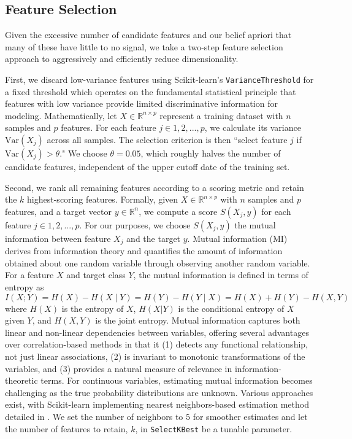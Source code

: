\documentclass[12pt,twoside]{report}
\begin{document}
\subsection{Feature Selection}

Given the excessive number of candidate features and our belief apriori that many of these have little to no signal, we take a two-step feature selection approach to aggressively and efficiently reduce dimensionality.

First, we discard low-variance features using Scikit-learn's \texttt{VarianceThreshold} for a fixed threshold which operates on the fundamental statistical principle that features with low variance provide limited discriminative information for modeling. Mathematically, let $X \in \mathbb{R}^{n \times p}$ represent a training dataset with $n$ samples and $p$ features. For each feature $j \in {1, 2, ..., p}$, we calculate its variance $\text{Var}(X_j)$ across all samples. The selection criterion is then ``select feature $j$ if $\text{Var}(X_j) > \theta$." We choose $\theta = 0.05$, which roughly halves the number of candidate features, independent of the upper cutoff date of the training set.

Second, we rank all remaining features according to a scoring metric and retain the $k$ highest-scoring features. Formally, given $X \in \mathbb{R}^{n \times p}$ with $n$ samples and $p$ features, and a target vector $y \in \mathbb{R}^n$, we compute a score $S(X_j, y)$ for each feature $j \in {1, 2, ..., p}$. For our purposes, we choose $S(X_j, y)$ the mutual information between feature $X_j$ and the target $y$. Mutual information (MI) derives from information theory and quantifies the amount of information obtained about one random variable through observing another random variable. For a feature $X$ and target class $Y$, the mutual information is defined in terms of entropy as
$$I(X; Y) = H(X) - H(X \mid Y) = H(Y) - H(Y \mid X) = H(X) + H(Y) - H(X, Y)$$
where $H(X)$ is the entropy of $X$, $H(X|Y)$ is the conditional entropy of $X$ given $Y$, and $H(X,Y)$ is the joint entropy. Mutual information captures both linear and non-linear dependencies between variables, offering several advantages over correlation-based methods in that it (1) detects any functional relationship, not just linear associations, (2) is invariant to monotonic transformations of the variables, and (3) provides a natural measure of relevance in information-theoretic terms. For continuous variables, estimating mutual information becomes challenging as the true probability distributions are unknown. Various approaches exist, with Scikit-learn implementing nearest neighbors-based estimation method detailed in \citep{kraskov_2004}. We set the number of neighbors to $5$ for smoother estimates and let the number of features to retain, $k$, in \texttt{SelectKBest} be a tunable parameter.
\end{document}
